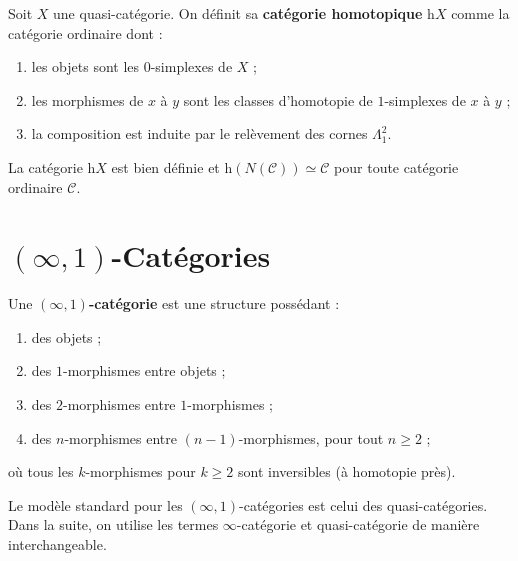 \begin{proposition}\label{prop:cat-homotopique}
Soit $X$ une quasi-catégorie.  On définit sa \textbf{catégorie
homotopique} $\mathrm{h}X$ comme la catégorie ordinaire dont :
\begin{enumerate}[label=(\roman*)]
\item les objets sont les $0$-simplexes de $X$ ;
\item les morphismes de $x$ à $y$ sont les classes d'homotopie de
      $1$-simplexes de $x$ à $y$ ;
\item la composition est induite par le relèvement des cornes
      $\Lambda^2_1$.
\end{enumerate}
La catégorie $\mathrm{h}X$ est bien définie et
$\mathrm{h}(N(\mathcal{C})) \simeq \mathcal{C}$ pour toute catégorie
ordinaire $\mathcal{C}$.
\end{proposition}


\section{$(\infty,1)$-Catégories}\label{sec:infty-1-categories}


\begin{definition}
\label{def:infty-1-cat}
Une \textbf{$(\infty,1)$-catégorie} est une structure possédant :
\begin{enumerate}[label=(\roman*)]
\item des objets ;
\item des $1$-morphismes entre objets ;
\item des $2$-morphismes entre $1$-morphismes ;
\item des $n$-morphismes entre $(n-1)$-morphismes, pour tout $n \geq 2$ ;
\end{enumerate}
où tous les $k$-morphismes pour $k \geq 2$ sont inversibles
(à homotopie près).
\end{definition}

\begin{remarque}\label{rem:infty-vs-quasi}
Le modèle standard pour les $(\infty,1)$-catégories est celui
des quasi-catégories.  Dans la suite, on utilise les termes
\og $\infty$-catégorie\fg{} et \og quasi-catégorie\fg{} de manière
interchangeable.
\end{remarque}

